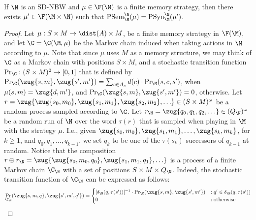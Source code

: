 \documentclass{lmcs}
\begin{document}
\begin{prop}\label{sd unif str}
	If $\N$ is an SD-NBW and $\mu\in \F(\M)$ is a finite memory strategy, then there exists $\mu'\in \F(\M\times \N)$ such that $\mathrm{PSem}^\N_\M(\mu)=\mathrm{PSyn}^\N_\M(\mu')$.
\end{prop}

\begin{proof}
	Let $\mu:S\times M\rightarrow \dist(A)\times M$, be a finite memory strategy in $\F(\M)$, and let $\C=\C(\M,\mu)$ be the Markov chain induced when taking actions in $\M$ according to $\mu$. Note that since $\mu$ uses $M$ as a memory structure, we may think of $\C$ as a Markov chain with positions $S\times M$, and a stochastic transition function $\Pr_\C:(S\times M)^2\rightarrow[0,1]$ that is defined by $\Pr_\C(\zug{s,m},\zug{s',m'})=\sum_{c\in A_s}d(c) \cdot \Pr_{\M}(s,c,s')$, when $\mu(s,m)=\zug{d,m'}$, and $\Pr_\C(\zug{s,m},\zug{s',m'})=0$, otherwise. Let $r=\zug{\zug{s_0,m_0},\zug{s_1,m_1},\zug{s_2,m_2},\ldots} \in (S\times M)^\omega$ be a random process sampled according to $\C$. 
	Let $r_\N=\zug{q_0,q_1,q_2,\ldots} \in (Q_\N)^\omega$ be a random run of $\N$ over the word $\tau(r)$ that is sampled when playing in $\M$ with the strategy $\mu$. I.e., given $\zug{s_0,m_0},\zug{s_1,m_1},\ldots,\zug{s_k,m_k}$, for $k\geq 1$, and $q_0,q_1,\ldots,q_{k-1}$, we set $q_k$ to be one of the $\tau(s_k)$-successors of $q_{k-1}$ at random. Notice that the composition $r\oplus r_\N= \zug{\zug{s_0,m_0,q_0},\zug{s_1,m_1,q_1},\ldots}$ is a process of a finite Markov chain $\C_\N$ with a set of positions $S\times M\times Q_\N$. Indeed, the stochastic transition function of $\C_\N$ can be expressed as follows:
	\begin{equation*}
		\Pr_{\C_\N}(\zug{s,m,q},\zug{s',m',q'})=
		\begin{cases}
			|\delta_\N(q,\tau(s'))|^{-1}\cdot \Pr_\C(\zug{s,m},\zug{s',m'})&:q'\in \delta_\N(q,\tau(s'))\\
			0&:\mbox{otherwise}
		\end{cases}
	\end{equation*}  


\end{proof}
\end{document}
